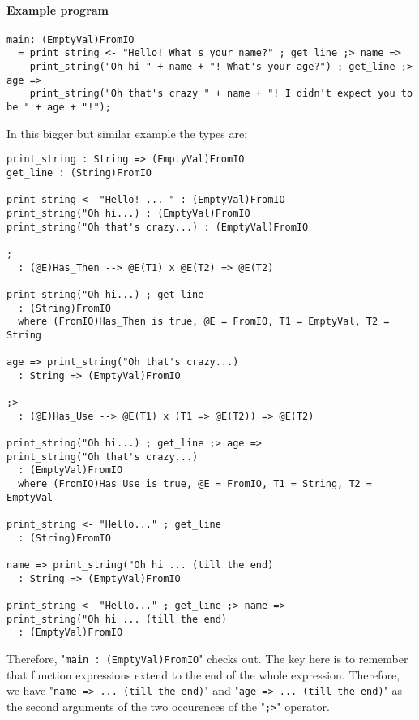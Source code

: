\documentclass{article}
\begin{document}
\paragraph{Example program}
\begin{verbatim}
main: (EmptyVal)FromIO
  = print_string <- "Hello! What's your name?" ; get_line ;> name =>
    print_string("Oh hi " + name + "! What's your age?") ; get_line ;> age =>
    print_string("Oh that's crazy " + name + "! I didn't expect you to be " + age + "!");
\end{verbatim}
In this bigger but similar example the types are:
\begin{verbatim}
print_string : String => (EmptyVal)FromIO
get_line : (String)FromIO

print_string <- "Hello! ... " : (EmptyVal)FromIO
print_string("Oh hi...) : (EmptyVal)FromIO
print_string("Oh that's crazy...) : (EmptyVal)FromIO

;
  : (@E)Has_Then --> @E(T1) x @E(T2) => @E(T2) 

print_string("Oh hi...) ; get_line
  : (String)FromIO
  where (FromIO)Has_Then is true, @E = FromIO, T1 = EmptyVal, T2 = String

age => print_string("Oh that's crazy...)
  : String => (EmptyVal)FromIO

;>
  : (@E)Has_Use --> @E(T1) x (T1 => @E(T2)) => @E(T2) 

print_string("Oh hi...) ; get_line ;> age =>
print_string("Oh that's crazy...)
  : (EmptyVal)FromIO
  where (FromIO)Has_Use is true, @E = FromIO, T1 = String, T2 = EmptyVal

print_string <- "Hello..." ; get_line
  : (String)FromIO

name => print_string("Oh hi ... (till the end)
  : String => (EmptyVal)FromIO

print_string <- "Hello..." ; get_line ;> name =>
print_string("Oh hi ... (till the end)
  : (EmptyVal)FromIO
\end{verbatim}
Therefore, "\texttt{main\ :\ (EmptyVal)FromIO}" checks out.  The key here is
to remember that function expressions extend to the end of the whole
expression. Therefore, we have "\texttt{name => ... (till the end)}" and
"\texttt{age => ... (till the end)}" as the second arguments of the two
occurences of the "\texttt{;>}" operator. 
\end{document}

